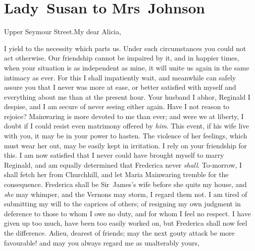 \chapter{Lady~Susan to Mrs~Johnson}
  
  \begin{mail}{Upper Seymour Street.}{My dear Alicia,}
  
I yield to the necessity which parts us. Under such circumstances you could not act otherwise. Our friendship cannot be impaired by it, and in happier times, when your situation is as independent as mine, it will unite us again in the same intimacy as ever. For this I shall impatiently wait, and meanwhile can safely assure you that I never was more at ease, or better satisfied with myself and everything about me than at the present hour. Your husband I abhor, Reginald I despise, and I am secure of never seeing either again. Have I not reason to rejoice? Mainwaring is more devoted to me than ever; and were we at liberty, I doubt if I could resist even matrimony offered by \textit{him}. This event, if his wife live with you, it may be in your power to hasten. The violence of her feelings, which must wear her out, may be easily kept in irritation. I rely on your friendship for this. I am now satisfied that I never could have brought myself to marry Reginald, and am equally determined that Frederica never \textit{shall}. To-morrow, I shall fetch her from Churchhill, and let Maria Mainwaring tremble for the consequence. Frederica shall be Sir~James's wife before she quits my house, and \textit{she} may whimper, and the Vernons may storm, I regard them not. I am tired of submitting my will to the caprices of others; of resigning my own judgment in deference to those to whom I owe no duty, and for whom I feel no respect. I have given up too much, have been too easily worked on, but Frederica shall now feel the difference. Adieu, dearest of friends; may the next gouty attack be more favourable! and may you always regard me as unalterably yours, 
\end{mail}